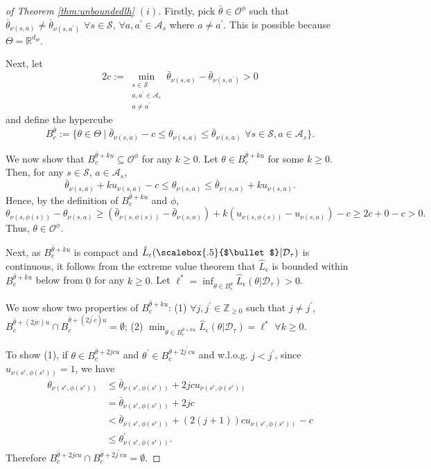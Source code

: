 \documentclass{amsart}
\renewcommand{\cdot}[1][.5]{%
  \mathbin{\vcenter{\hbox{\scalebox{#1}{$\bullet$}}}}%
}
\begin{document}
\begin{proof}[of Theorem \ref{thm:unboundedlh} $(i)$]    
Firstly, pick $\bar{\theta}\in \mathcal{O}^\phi$ such that $\bar{\theta}_{\nu(s,a)} \neq \bar{\theta}_{\nu(s,a^\prime)}$ $\forall s \in \mathcal{S}$, $\forall a,a^\prime \in \mathcal{A}_s$ where $a \neq a^\prime$. This is possible because $\Theta = \mathbb{R}^{d_\Theta}$.

Next, let $$2c:=\min\limits_{\substack{s \in \mathcal{S}\\ a,a^\prime \in \mathcal{A}_s\\ a \neq a^\prime}} \bar{\theta}_{\nu(s,a)} - \bar{\theta}_{\nu(s,a^\prime)} > 0$$
and define the hypercube
$$B_c^{\bar{\theta}} := \{\theta \in \Theta \mid \bar{\theta}_{\nu(s,a)} - c \leq \theta_{\nu(s,a)} \leq \bar{\theta}_{\nu(s,a)} \,\, \forall s\in \mathcal{S}, a \in \mathcal{A}_s\}.$$
    
We now show that $B_c^{\bar{\theta}+ku} \subseteq \mathcal{O}^\phi$ for any $k \geq 0$. Let $\theta \in B_c^{\bar{\theta}+ku}$ for some $k \geq 0$. Then, for any $s \in \mathcal{S}$, $a \in \mathcal{A}_s$,
        $$\bar{\theta}_{\nu(s,a)} + ku_{\nu(s,a)} - c  \leq  \theta_{\nu(s,a)} \leq  \bar{\theta}_{\nu(s,a)} + ku_{\nu(s,a)}.$$
Hence, by the definition of $B_c^{\bar{\theta}+ku}$ and $\phi$, 
$$\theta_{\nu(s,\phi(s))} - \theta_{\nu(s,a)} \geq (\bar{\theta}_{\nu(s,\phi(s))} - \bar{\theta}_{\nu(s,a)}) + k (u_{\nu(s,\phi(s))} - u_{\nu(s,a)}) - c \geq 2c + 0 - c > 0.$$
Thus, $\theta \in \mathcal{O}^\phi$.

Next, as $B_c^{\bar{\theta}+ku}$ is compact and $\hat{L}_\epsilon(\cdot|\mathcal{D}_\tau)$ is continuous, it follows from the extreme value theorem that $\hat{L}_\epsilon$ is bounded within  $B_c^{\bar{\theta}+ku}$ below from $0$ for any $k \geq 0$. Let $\ell^*=\inf_{\theta \in B_c^{\bar{\theta}}} \hat{L}_\epsilon(\theta|\mathcal{D}_\tau) > 0$. 

We now show two properties of $B_c^{\bar{\theta}+ku}$: (1) $\forall j,j^\prime \in \mathbb{Z}_{\geq 0}$ such that $j\neq j^\prime$, $B_c^{\bar{\theta}+(2jc)u} \cap B_c^{\bar{\theta}+(2j^\prime c)u} = \emptyset$; (2) $\min_{\theta \in B_c^{\bar{\theta} + ku}} \hat{L}_\epsilon(\theta|\mathcal{D}_\tau) = \ell^*$ $\forall k \geq 0$. 

    
To show (1), if $\theta \in B_c^{\bar{\theta} + 2jcu}$ and $\theta^\prime \in B_c^{\bar{\theta} + 2j^\prime c u}$  and w.l.o.g. $j < j^\prime$, since $u_{\nu(s^r,\phi(s^r))} = 1$, we have
\begin{align*}
\theta_{\nu(s^r,\phi(s^r))} &\leq \bar{\theta}_{\nu(s^r,\phi(s^r))} + 2jcu_{\nu(s^r,\phi(s^r))} \\
&=  \bar{\theta}_{\nu(s^r,\phi(s^r))}+2jc  \\
&< \bar{\theta}_{\nu(s^r,\phi(s^r))} +(2(j+1))cu_{\nu(s^r,\phi(s^r))} - c \\
&\leq \theta^\prime_{\nu(s^r,\phi(s^r))}.
\end{align*}
Therefore $ B_c^{\bar{\theta} + 2jcu} \cap  B_c^{\bar{\theta} + 2j^\prime cu}=\emptyset$.


\end{proof}
\end{document}
